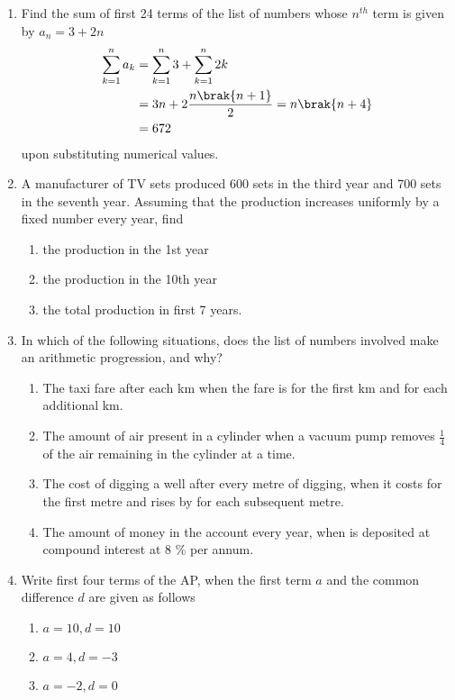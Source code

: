\begin{enumerate}[label=\thesubsection.\arabic*, ref=\thesubsection.\theenumi]
\begin{enumerate}
\end{enumerate}
\item Find the sum of first 24 terms of the list of numbers whose $n^{th}$ term is given by $a_n = 3 + 2n$
	\\
	\solution
\begin{align}
	\sum_{k=1}^{n}a_k &= \sum_{k=1}^{n}3 + \sum_{k=1}^{n}2k
	\\
	&=3n + 2\frac{n\brak{n+1}}{2} = n\brak{n+4}
	\\
	&= 672
\end{align}
upon substituting numerical values.
\item A manufacturer of TV sets produced 600 sets in the third year and 700
sets in the seventh year. Assuming that the production increases uniformly by a fixed number every year,  find 
\begin{enumerate}
\item   the production in the 1st year
\item	the production in the 10th year
\item the total production in first 7 years.
\end{enumerate}
\item In which of the following situations,  does the list of numbers involved make an arithmetic progression,  and why?
\begin{enumerate}
\item The taxi fare after each km when the fare is  for the first km and  for each additional km.
\item The amount of air present in a cylinder when a vacuum pump removes 
$\frac{1}{4}$ of the air remaining in the cylinder at a time.
\item  The cost of digging a well after every metre of digging,  when it costs  for the first metre and rises by  for each subsequent metre.
\item The amount of money in the account every year,  when  is deposited at compound interest at 8 \% per annum.
\end{enumerate}
\item Write first four terms of the AP,  when the first term $a$ and the common difference $d$ are
given as follows
		\begin{multicols}{2}
\begin{enumerate}
\item $a = 10,  d = 10	$	
\item $a = 4,  d = -3	$	
\item $a = -2,  d = 0	$	

\end{enumerate}
\end{multicols}
\end{enumerate}
